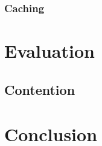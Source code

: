 \documentclass[../main.tex]{subfiles}
\begin{document}
    \subsubsection{Caching}

\section{Evaluation}

  \subsection{Contention}

\section{Conclusion}
\end{document}
